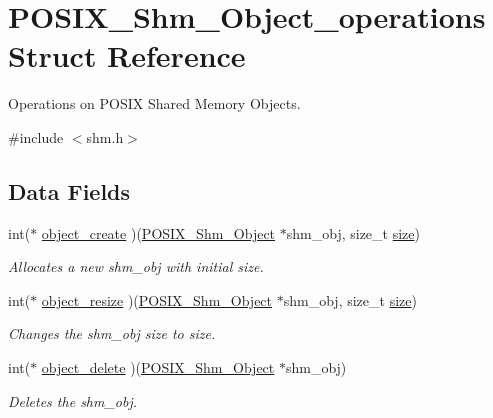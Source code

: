 \hypertarget{structPOSIX__Shm__Object__operations}{}\section{P\+O\+S\+I\+X\+\_\+\+Shm\+\_\+\+Object\+\_\+operations Struct Reference}
\label{structPOSIX__Shm__Object__operations}


Operations on P\+O\+S\+IX Shared Memory Objects.  




{\ttfamily \#include $<$shm.\+h$>$}

\subsection*{Data Fields}
\begin{DoxyCompactItemize}
\item 
int($\ast$ \mbox{\hyperlink{structPOSIX__Shm__Object__operations_a79b39f6b71f0d02fe2e6d3a875da6009}{object\+\_\+create}} )(\mbox{\hyperlink{structPOSIX__Shm__Object}{P\+O\+S\+I\+X\+\_\+\+Shm\+\_\+\+Object}} $\ast$shm\+\_\+obj, size\+\_\+t \mbox{\hyperlink{sun4u_2tte_8h_a245260f6f74972558f61b85227df5aae}{size}})
\begin{DoxyCompactList}\small\item\em Allocates a new {\itshape shm\+\_\+obj} with initial {\itshape size}. \end{DoxyCompactList}\item 
int($\ast$ \mbox{\hyperlink{structPOSIX__Shm__Object__operations_adc4a14e2eddd68f82f851e458ff1420f}{object\+\_\+resize}} )(\mbox{\hyperlink{structPOSIX__Shm__Object}{P\+O\+S\+I\+X\+\_\+\+Shm\+\_\+\+Object}} $\ast$shm\+\_\+obj, size\+\_\+t \mbox{\hyperlink{sun4u_2tte_8h_a245260f6f74972558f61b85227df5aae}{size}})
\begin{DoxyCompactList}\small\item\em Changes the {\itshape shm\+\_\+obj} size to {\itshape size}. \end{DoxyCompactList}\item 
int($\ast$ \mbox{\hyperlink{structPOSIX__Shm__Object__operations_ae9c4b17f0861a7e2a7aa45e819e008c4}{object\+\_\+delete}} )(\mbox{\hyperlink{structPOSIX__Shm__Object}{P\+O\+S\+I\+X\+\_\+\+Shm\+\_\+\+Object}} $\ast$shm\+\_\+obj)
\begin{DoxyCompactList}\small\item\em Deletes the {\itshape shm\+\_\+obj}. \end{DoxyCompactList}\item 

\end{DoxyCompactItemize}
